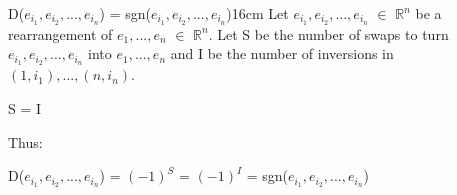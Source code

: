     \vspace{0.5cm}



    \begin{wtheorem}{D($e_{i_1},e_{i_2},...,e_{i_n}$)
    = sgn($e_{i_1},e_{i_2},...,e_{i_n}$)}{16cm}
        Let $e_{i_1},e_{i_2},...,e_{i_n}$ $\in$ $\mathbb{R}^n$
        be a rearrangement of $e_1,...,e_n$ $\in$ $\mathbb{R}^n$.
        Let S be the number of swaps to turn $e_{i_1},e_{i_2},...,e_{i_n}$
        into $e_1,...,e_n$ and I be the number of inversions
        in $(1,i_1),...,(n,i_n)$.

        \hspace{0.5cm}
        S = I

        Thus:

        \hspace{0.5cm}
        D($e_{i_1},e_{i_2},...,e_{i_n}$)
        = $(-1)^S$
        = $(-1)^I$
        = sgn($e_{i_1},e_{i_2},...,e_{i_n}$)
    \end{wtheorem}

